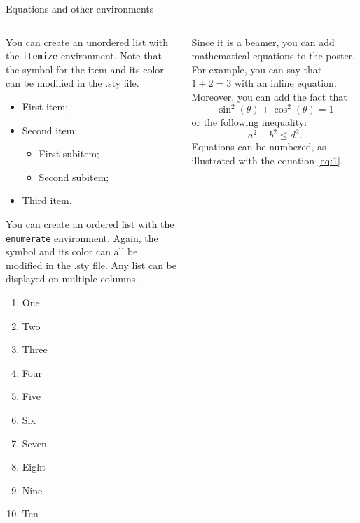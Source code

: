 \documentclass{beamer}
\newlength{\onecolwid}
\newlength{\twocolwid}
\begin{document}
\begin{frame}[t, fragile]
\begin{columns}[t]
\begin{column}{\twocolwid}
\begin{block}{Equations and other environments}
\begin{columns}[t,totalwidth=\twocolwid]
		\begin{column}{\onecolwid}
		
		You can create an unordered list with the \texttt{itemize} environment. Note that the symbol for the item and its color can be modified in the .sty file.
		
		\vspace{0.25in}
		\begin{itemize}
			\item First item;
			\item Second item;
			\begin{itemize}
			  \item First subitem;
			  \item Second subitem;
			\end{itemize}
			\item Third item.
		\end{itemize}
		\vspace{0.25in}
			
		You can create an ordered list with the \texttt{enumerate} environment. Again, the symbol and its color can all be modified in the .sty file. Any list can be displayed on multiple columns.
		
		\vspace{0.25in}
		\begin{multicols}{2}
			\begin{enumerate}
				\item One
				\item Two
				\item Three
				\item Four
				\item Five
				\item Six
				\item Seven
				\item Eight
				\item Nine
				\item Ten
			\end{enumerate}
		\end{multicols}
	
		\end{column}
	
		\begin{column}{\onecolwid}
		
		Since it is a beamer, you can add mathematical equations to the poster. For example, you can say that $1+2=3$ with an inline equation. Moreover, you can add the fact that
	  \vspace{0.15in}
	  \begin{equation}
	  	\sin^2(\theta) + \cos^2(\theta) = 1 \label{eq:1}
	  \end{equation}
	  or the following inequality:
	  \begin{equation*}
	  	a^2 + b^2 \leq d^2.
	  \end{equation*}
	  Equations can be numbered, as illustrated with the equation \eqref{eq:1}.
	  

\end{column}
\end{columns}
\end{block}
\end{column}
\end{columns}
\end{frame}
\end{document}
